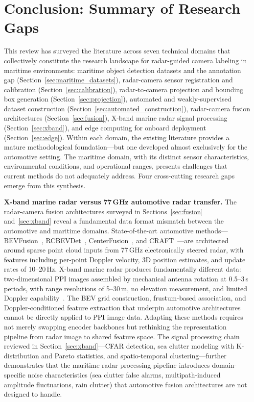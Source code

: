 \section{Conclusion: Summary of Research Gaps}
\label{sec:conclusion}

This review has surveyed the literature across seven technical domains that collectively constitute the research landscape for radar-guided camera labeling in maritime environments: maritime object detection datasets and the annotation gap (Section~\ref{sec:maritime_datasets}), radar-camera sensor registration and calibration (Section~\ref{sec:calibration}), radar-to-camera projection and bounding box generation (Section~\ref{sec:projection}), automated and weakly-supervised dataset construction (Section~\ref{sec:automated_construction}), radar-camera fusion architectures (Section~\ref{sec:fusion}), X-band marine radar signal processing (Section~\ref{sec:xband}), and edge computing for onboard deployment (Section~\ref{sec:edge}). Within each domain, the existing literature provides a mature methodological foundation---but one developed almost exclusively for the automotive setting. The maritime domain, with its distinct sensor characteristics, environmental conditions, and operational ranges, presents challenges that current methods do not adequately address. Four cross-cutting research gaps emerge from this synthesis.

\textbf{X-band marine radar versus 77\,GHz automotive radar transfer.} The radar-camera fusion architectures surveyed in Sections~\ref{sec:fusion} and~\ref{sec:xband} reveal a fundamental data format mismatch between the automotive and maritime domains. State-of-the-art automotive methods---BEVFusion~\cite{liu2023bevfusion}, RCBEVDet~\cite{Lin2024RCBEVDet}, CenterFusion~\cite{Nabati2021CenterFusion}, and CRAFT~\cite{Kim2022CRAFT}---are architected around sparse point cloud inputs from 77\,GHz electronically steered radar, with features including per-point Doppler velocity, 3D position estimates, and update rates of 10--20\,Hz. X-band marine radar produces fundamentally different data: two-dimensional PPI images assembled by mechanical antenna rotation at 0.5--3\,s periods, with range resolutions of 5--30\,m, no elevation measurement, and limited Doppler capability~\cite{Skolnik2008,Richards2022}. The BEV grid construction, frustum-based association, and Doppler-conditioned feature extraction that underpin automotive architectures cannot be directly applied to PPI image data. Adapting these methods requires not merely swapping encoder backbones but rethinking the representation pipeline from radar image to shared feature space. The signal processing chain reviewed in Section~\ref{sec:xband}---CFAR detection, sea clutter modeling with K-distribution and Pareto statistics, and spatio-temporal clustering---further demonstrates that the maritime radar processing pipeline introduces domain-specific noise characteristics (sea clutter false alarms, multipath-induced amplitude fluctuations, rain clutter) that automotive fusion architectures are not designed to handle.

